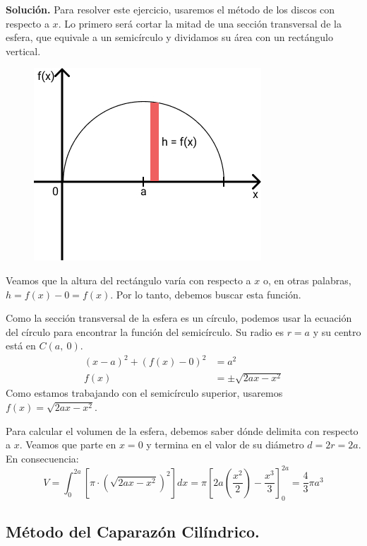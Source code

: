 \documentclass[12pt]{article}
\begin{document}
\textbf{Solución.} \quad Para resolver este ejercicio, usaremos el método de los discos con respecto a $x$. Lo primero será cortar la mitad de una sección transversal de la esfera, que equivale a un semicírculo y dividamos su área con un rectángulo vertical.

\newpage

\begin{figure}[hbt!]
\centering
\includegraphics[scale=0.5]{img/sphere-example-3.jpg}
\end{figure}

Veamos que la altura del rectángulo varía con respecto a $x$ o, en otras palabras, $h = f(x) - 0 = f(x)$. Por lo tanto, debemos buscar esta función.

Como la sección transversal de la esfera es un círculo, podemos usar la ecuación del círculo para encontrar la función del semicírculo. Su radio es $r = a$ y su centro está en $C(a, \ 0)$.
\begin{align*}
(x - a)^{2} + (f(x) - 0)^{2} &= a^{2} \\
f(x) &= \pm \sqrt{2ax - x^{2}}
\end{align*}
Como estamos trabajando con el semicírculo superior, usaremos $f(x) = \sqrt{2ax - x^{2}}$.

Para calcular el volumen de la esfera, debemos saber dónde delimita con respecto a $x$. Veamos que parte en $x = 0$ y termina en el valor de su diámetro $d = 2r = 2a$. En consecuencia:
\[
  V = \int_{0}^{2a} \left[\pi \cdot \left(\sqrt{2ax - x^{2}}\right)^{2} \right] dx
    = \pi \left[2a\left(\frac{x^{2}}{2}\right) - \frac{x^{3}}{3}\right]_{0}^{2a}
    = \frac{4}{3} \pi a^{3}
\]

\subsection{Método del Caparazón Cilíndrico.}
\end{document}
